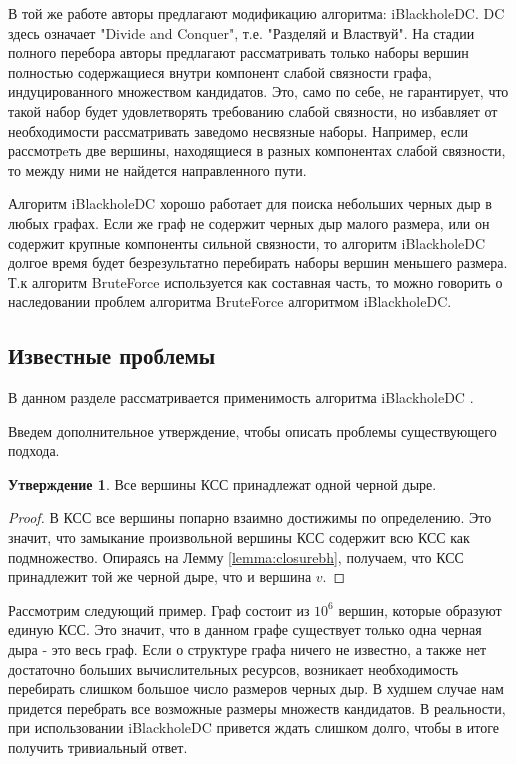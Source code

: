 \documentclass[12pt,a4paper,oneside,openany]{article}
\theoremstyle{definition}
\theoremstyle{lemma}
\newtheorem{lemma}{Утверждение}[]
\theoremstyle{remark}
\begin{document}
В той же работе авторы предлагают модификацию алгоритма: iBlackholeDC. DC здесь означает "Divide and Conquer", т.е. "Разделяй и Властвуй".
На стадии полного перебора авторы предлагают рассматривать только наборы вершин полностью содержащиеся внутри компонент слабой связности
графа, индуцированного множеством кандидатов.
Это, само по себе, не гарантирует, что такой набор будет удовлетворять требованию слабой связности, но избавляет от необходимости
рассматривать заведомо несвязные наборы. Например, если рассмотрeть две вершины, находящиеся в разных компонентах слабой связности,
то между ними не найдется направленного пути.

Алгоритм iBlackholeDC хорошо работает для поиска небольших черных дыр в любых графах.
Если же граф не содержит черных дыр малого размера, или он содержит крупные компоненты сильной связности,
то алгоритм iBlackholeDC долгое время будет безрезультатно перебирать наборы вершин меньшего размера.
Т.к алгоритм BruteForce используется как составная часть, то можно говорить о наследовании проблем
алгоритма BruteForce алгоритмом iBlackholeDC.

\subsection{Известные проблемы}\label{subsec:knownissues}

В данном разделе рассматривается применимость алгоритма iBlackholeDC \cite{li2010detecting}.

Введем дополнительное утверждение, чтобы описать проблемы существующего подхода.

\begin{lemma}{}
Все вершины КСС принадлежат одной черной дыре.
\end{lemma}
\begin{proof}
В КСС все вершины попарно взаимно достижимы по определению.
Это значит, что замыкание произвольной вершины КСС содержит всю КСС как подмножество.
Опираясь на Лемму \ref{lemma:closurebh}, получаем, что КСС принадлежит той же черной дыре, что и вершина $v$.
\end{proof}

Рассмотрим следующий пример.
Граф состоит из $10^6$ вершин, которые образуют единую КСС.
Это значит, что в данном графе существует только одна черная дыра - это весь граф.
Если о структуре графа ничего не известно, а также нет достаточно больших вычислительных ресурсов,
возникает необходимость перебирать слишком большое число размеров черных дыр.
В худшем случае нам придется перебрать все возможные размеры множеств кандидатов.
В реальности, при использовании iBlackholeDC привется ждать слишком долго, чтобы в итоге получить тривиальный ответ.
\end{document}
